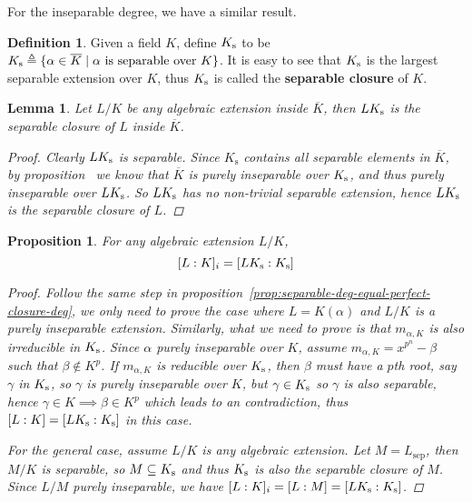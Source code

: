 \documentclass[a4paper]{article}
\newcommand{\defeq}{\triangleq}
\newtheorem{lemma}{Lemma}
\theoremstyle{remark}
\theoremstyle{definition}
\theoremstyle{definition}
\newtheorem{definition}{Definition}
\theoremstyle{plain}
\newtheorem{proposition}{Proposition}
\begin{document}
  For the inseparable degree, we have a similar result.

  \begin{definition}
    Given a field $K$, define $K_\mathrm{s}$ to be
    $\Ks \defeq \{ \alpha \in \overline{K} \mid \alpha \text{ is separable over } K \}$.
    It is easy to see that $K_\mathrm{s}$ is the largest separable extension over $K$, thus
    $K_\mathrm{s}$ is called the {\bf separable closure} of $K$.
  \end{definition}

  \begin{lemma} \label{lemma:separable-closure-of-ext}
    Let $L/K$ be any algebraic extension inside $\overline{K}$, then $L K_\mathrm{s}$ is
    the separable closure of $L$ inside $\overline{K}$.

    \begin{proof}
      Clearly $L K_\mathrm{s}$ is separable.
      Since $K_\text{s}$ contains all separable elements in $\overline{K}$, by proposition~\label{prop:decomp-of-insep}
      we know that $\overline{K}$ is purely inseparable over $K_\mathrm{s}$, and thus purely inseparable over $L K_\mathrm{s}$.
      So $L K_\mathrm{s}$ has no non-trivial separable extension, hence $LK_\mathrm{s}$ is the separable closure of $L$.
    \end{proof}
  \end{lemma}

  \begin{proposition}
    For any algebraic extension $L/K$,
    \[ [L: K]_i = [L K_\mathrm{s}: K_\mathrm{s}] \]

    \begin{proof}
      Follow the same step in proposition~\ref{prop:separable-deg-equal-perfect-closure-deg},
      we only need to prove the case where $L = K(\alpha)$ and $L/K$ is a purely inseparable extension.
      Similarly, what we need to prove is that $m_{\alpha, K}$ is also irreducible in $K_\mathrm{s}$.
      Since $\alpha$ purely inseparable over $K$, assume $m_{\alpha, K} = x^{p^n} - \beta$
      such that $\beta \not\in K^p$. If $m_{\alpha, K}$ is reducible over $K_\mathrm{s}$, then
      $\beta$ must have a $p$th root, say $\gamma$ in $K_\mathrm{s}$, so $\gamma$ is purely inseparable over $K$,
      but $\gamma \in K_\mathrm{s}$ so $\gamma$ is also separable, hence $\gamma \in K \implies \beta \in K^p$
      which leads to an contradiction, thus $[L: K] = [L K_\mathrm{s}: K_\mathrm{s}]$ in this case.

      For the general case, assume $L/K$ is any algebraic extension. Let $M = L_\text{sep}$,
      then $M/K$ is separable, so $M \subseteq K_\mathrm{s}$ and thus $K_\mathrm{s}$ is also the separable closure of $M$.
      Since $L/M$ purely inseparable, we have $[L: K]_i = [L: M] = [L K_\mathrm{s}: K_\mathrm{s}]$.
    \end{proof}
  \end{proposition}
\end{document}
